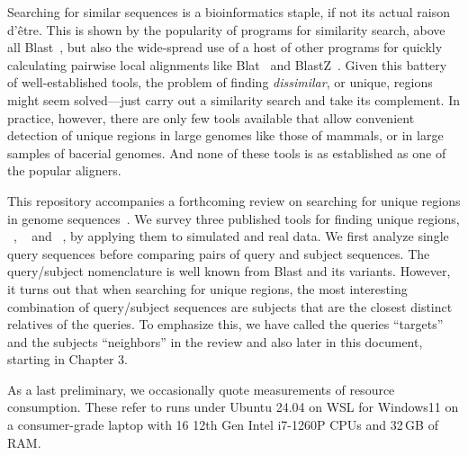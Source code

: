 Searching for similar sequences is a bioinformatics staple, if not its
actual raison d'\^etre. This is shown by the popularity of programs
for similarity search, above all Blast~\cite{alt90:bas,alt97:gap}, but
also the wide-spread use of a host of other programs for quickly
calculating pairwise local alignments like Blat~\cite{ken02:bla} and
BlastZ~\cite{sch03:hum}. Given this battery of well-established tools,
the problem of finding \emph{dissimilar}, or unique, regions might
seem solved---just carry out a similarity search and take its
complement. In practice, however, there are only few tools available
that allow convenient detection of unique regions in large genomes
like those of mammals, or in large samples of bacerial genomes. And
none of these tools is as established as one of the popular aligners.

This repository accompanies a forthcoming review on searching for
unique regions in genome sequences~\cite{vie25:fas}. We survey three
published tools for finding unique
regions, ~\cite{poc20:gen}, ~\cite{pir19:hig}
and ~\cite{hau21:fur,vie24:mar}, by applying them to simulated
and real data. We first analyze single query sequences before
comparing pairs of query and subject sequences. The query/subject
nomenclature is well known from Blast and its variants. However, it
turns out that when searching for unique regions, the most interesting
combination of query/subject sequences are subjects that are the
closest distinct relatives of the queries. To emphasize this, we have
called the queries ``targets'' and the subjects ``neighbors'' in the
review and also later in this document, starting in Chapter 3.

As a last preliminary, we occasionally quote measurements of resource
consumption. These refer to runs under Ubuntu 24.04 on WSL for
Windows11 on a consumer-grade laptop with 16 12th Gen Intel i7-1260P
CPUs and 32\,GB of RAM.
